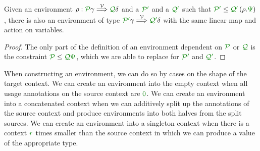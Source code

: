 \begin{lemma}\label{thm:env-resize}
  Given an environment $\rho : \grP\gamma \env\V \grQ\delta$ and a $\grPprime$
  and a $\grQprime$ such that $\grPprime \leq \grQprime\plr{\rho.\gr\Psi}$,
  there is also an environment of type $\grPprime\gamma \env\V \grQprime\delta$
  with the same linear map and action on variables.
\end{lemma}
\begin{proof}
  The only part of the definition of an environment dependent on $\grP$ or
  $\grQ$ is the constraint $\grP \leq \grQ\gr\Psi$, which we are able to
  replace for $\grPprime$ and $\grQprime$.
\end{proof}

When constructing an environment, we can do so by cases on the shape of the
target context.
We can create an environment into the empty context when all usage annotations
on the source context are $\gr0$.
We can create an environment into a concatenated context when we can additively
split up the annotations of the source context and produce environments into
both halves from the split sources.
We can create an environment into a singleton context when there is a context
$\gr r$ times smaller than the source context in which we can produce a value
of the appropriate type.

